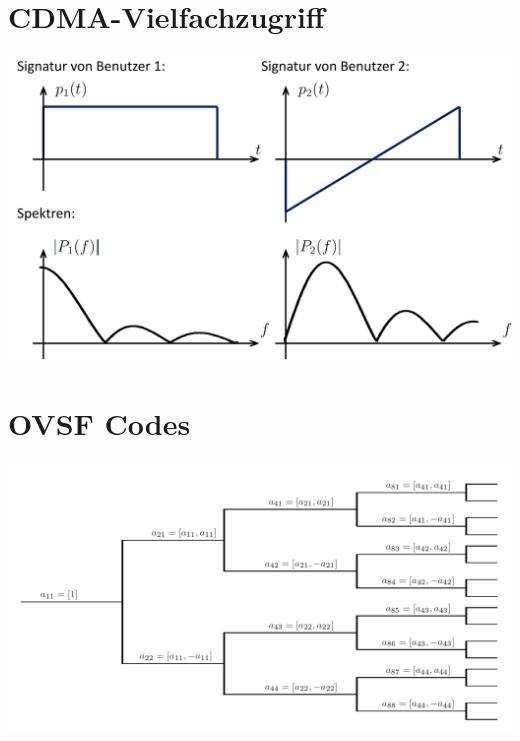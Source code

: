 \section{CDMA-Vielfachzugriff}
\begin{center}
	\includegraphics[width=.9\textwidth]{./images/cdma.png}
\end{center}

\section{OVSF Codes}
\begin{center}
	\includegraphics[width=.9\textwidth]{./images/ovsf.png}
\end{center}